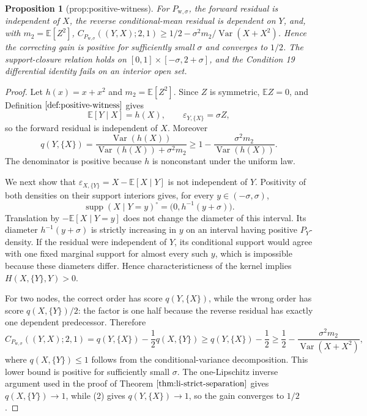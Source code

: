 \documentclass{article}
\newtheorem{proposition}{Proposition}
\begin{document}
\begin{proposition}[prop:positive-witness]\label{prop:positive-witness}
For \(P_{\mathrm w,\sigma}\), the forward residual is independent of \(X\), the reverse conditional-mean residual is dependent on \(Y\), and, with \(m_2=\mathbb E[Z^2]\), \(C_{P_{\mathrm w,\sigma}}((Y,X);2,1)\ge1/2-\sigma^2m_2/\operatorname{Var}(X+X^2)\). Hence the correcting gain is positive for sufficiently small \(\sigma\) and converges to \(1/2\). The support-closure relation holds on \([0,1]\times[-\sigma,2+\sigma]\), and the Condition 19 differential identity fails on an interior open set.
\end{proposition}
\begin{proof}
Let \(h(x)=x+x^2\) and \(m_2=\mathbb E[Z^2]\).  Since \(Z\) is symmetric, \(\mathbb E Z=0\), and Definition \(\ref{def:positive-witness}\) gives
\[
 \mathbb E[Y\mid X]=h(X),\qquad
 \varepsilon_{Y,\{X\}}=\sigma Z,
\]
so the forward residual is independent of \(X\).  Moreover
\[
 q(Y,\{X\})
 =\frac{\operatorname{Var}(h(X))}
 {\operatorname{Var}(h(X))+\sigma^2m_2}
 \ge 1-\frac{\sigma^2m_2}{\operatorname{Var}(h(X))}. \tag{2}
\]
The denominator is positive because \(h\) is nonconstant under the uniform law.

We next show that \(\varepsilon_{X,\{Y\}}=X-\mathbb E[X\mid Y]\) is not independent of \(Y\).  Positivity of both densities on their support interiors gives, for every \(y\in(-\sigma,\sigma)\),
\[
 \operatorname{supp}(X\mid Y=y)^{\circ}
 =\bigl(0,h^{-1}(y+\sigma)\bigr).
\]
Translation by \(-\mathbb E[X\mid Y=y]\) does not change the diameter of this interval.  Its diameter \(h^{-1}(y+\sigma)\) is strictly increasing in \(y\) on an interval having positive \(P_Y\)-density.  If the residual were independent of \(Y\), its conditional support would agree with one fixed marginal support for almost every such \(y\), which is impossible because these diameters differ.  Hence characteristicness of the kernel implies \(H(X,\{Y\},Y)>0\).

For two nodes, the correct order has score \(q(Y,\{X\})\), while the wrong order has score \(q(X,\{Y\})/2\): the factor is one half because the reverse residual has exactly one dependent predecessor.  Therefore
\[
 C_{P_{\mathrm w,\sigma}}((Y,X);2,1)
 =q(Y,\{X\})-\frac12q(X,\{Y\})
 \ge q(Y,\{X\})-\frac12
 \ge\frac12-\frac{\sigma^2m_2}{\operatorname{Var}(X+X^2)},
\]
where \(q(X,\{Y\})\le1\) follows from the conditional-variance decomposition.  This lower bound is positive for sufficiently small \(\sigma\).  The one-Lipschitz inverse argument used in the proof of Theorem \(\ref{thm:li-strict-separation}\) gives \(q(X,\{Y\})\to1\), while (2) gives \(q(Y,\{X\})\to1\), so the gain converges to \(1/2\).


\end{proof}
\end{document}
